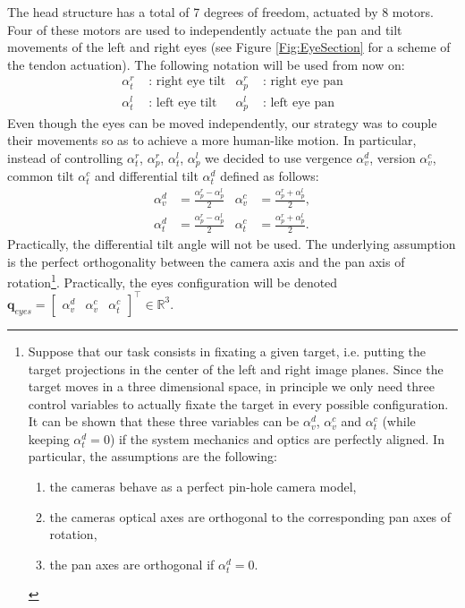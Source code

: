 The head structure has a total of 7 degrees of freedom, actuated by 8 motors. Four of these motors are used to independently actuate the pan and tilt movements of the left and right eyes (see Figure \ref{Fig:EyeSection} for a scheme of the tendon actuation). The following notation will be used from now on:
\begin{align*}
\alpha_t^r & \mbox{ : } \mbox{right eye tilt} & \alpha_p^r & \mbox{ : } \mbox{right eye pan}\\
\alpha_t^l & \mbox{ : } \mbox{left eye tilt} & \alpha_p^l & \mbox{ : } \mbox{left eye pan}
\end{align*}
Even though the eyes can be moved independently, our strategy was to couple their movements so as to achieve a more human-like motion. In particular, instead of controlling $\alpha_t^r$, $\alpha_p^r$, $\alpha_t^l$, $\alpha_p^l$ we decided to use vergence $\alpha_v^d$, version $\alpha_v^c$, common tilt $\alpha_t^c$ and differential tilt $\alpha_t^d$ defined as follows:
\begin{align*}
\alpha_v^d & = \frac{\alpha_p^r - \alpha_p^l}{2} & \alpha_v^c & = \frac{\alpha_p^r + \alpha_p^l}{2},\\
\alpha_t^d & = \frac{\alpha_p^r - \alpha_p^l}{2} & \alpha_t^c & = \frac{\alpha_p^r + \alpha_p^l}{2}.
\end{align*}
Practically, the differential tilt angle will not be used. The underlying assumption is the perfect orthogonality between the camera axis and the pan axis of rotation\footnote{\samepage Suppose that our task consists in fixating a given target, i.e. putting the target projections in the center of the left and right image planes. Since the target moves in a three dimensional space, in principle we only need three control variables to actually fixate the target in every possible configuration. It can be shown that these three variables can be $\alpha_v^d$, $\alpha_v^c$ and $\alpha_t^c$ (while keeping $\alpha_t^d=0$) if the system mechanics and optics are perfectly aligned. In particular, the assumptions are the following:
\begin{enumerate}
\item the cameras behave as a perfect pin-hole camera model,
\item the cameras optical axes are orthogonal to the corresponding pan axes of rotation,
\item the pan axes are orthogonal if $\alpha_t^d=0$.
\end{enumerate}}. Practically, the eyes configuration will be denoted $\mathbf q_{eyes} = \begin{bmatrix} \alpha_v^d & \alpha_v^c & \alpha_t^c \end{bmatrix}^\top \in \mathbb R^3$.


